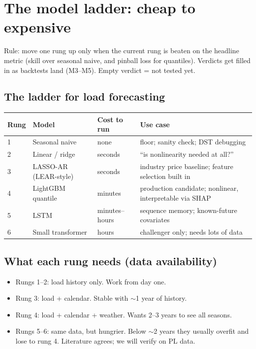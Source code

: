 \section{The model ladder: cheap to expensive}

Rule: move one rung up only when the current rung is beaten on the headline
metric (skill over seasonal naive, and pinball loss for quantiles).
Verdicts get filled in as backtests land (M3--M5). Empty verdict = not tested yet.

\subsection{The ladder for load forecasting}

\begin{center}
\begin{tabular}{lllp{4.5cm}}
\toprule
Rung & Model & Cost to run & Use case \\
\midrule
1 & Seasonal naive        & none    & floor; sanity check; DST debugging \\
2 & Linear / ridge        & seconds & ``is nonlinearity needed at all?'' \\
3 & LASSO-AR (LEAR-style) & seconds & industry price baseline; feature selection built in \\
4 & LightGBM quantile     & minutes & production candidate; nonlinear, interpretable via SHAP \\
5 & LSTM                  & minutes--hours & sequence memory; known-future covariates \\
6 & Small transformer     & hours   & challenger only; needs lots of data \\
\bottomrule
\end{tabular}
\end{center}

\subsection{What each rung needs (data availability)}

\begin{itemize}
  \item Rungs 1--2: load history only. Work from day one.
  \item Rung 3: load + calendar. Stable with $\sim$1 year of history.
  \item Rung 4: load + calendar + weather. Wants 2--3 years to see all seasons.
  \item Rungs 5--6: same data, but hungrier. Below $\sim$2 years they usually
        overfit and lose to rung 4. Literature agrees; we will verify on PL data.
\end{itemize}

